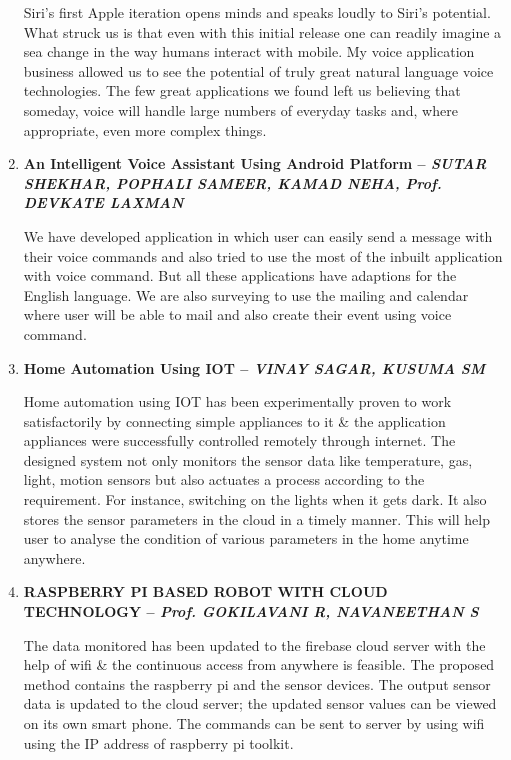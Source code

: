 \documentclass[16pt,oneside,a4paper]{article}
\begin{document}
\begin{enumerate}
Siri's first Apple iteration opens minds and speaks loudly to Siri's potential. What struck us is that even with this initial release one can readily imagine a sea change in the way humans interact with mobile. My voice application business allowed us to see the potential of truly great natural language voice technologies. The few great applications we found left us believing that someday, voice will handle large numbers of everyday tasks and, where appropriate, even more complex things.\\

\item \textbf{An Intelligent Voice Assistant Using Android Platform -- \textit{SUTAR SHEKHAR, POPHALI SAMEER, KAMAD NEHA, Prof. DEVKATE LAXMAN}}

We have developed application in which user can easily send a message with their voice commands and also tried to use the most of the inbuilt application with voice command. But all these applications have adaptions for the English language. We are also surveying to use the mailing and calendar where user will be able to mail and also create their event using voice command.\\

\item \textbf{Home Automation Using IOT  -- \textit{VINAY SAGAR, KUSUMA SM}}

Home automation using IOT has been experimentally proven to work satisfactorily by connecting simple appliances to it \& the application appliances were successfully controlled remotely through internet. The designed system not only monitors the sensor data like temperature, gas, light, motion sensors but also actuates a process according to the requirement. For instance, switching on the lights when it gets dark. It also stores the sensor parameters in the cloud in a timely manner. This will help user to analyse the condition of various parameters in the home anytime anywhere.\\

\item \textbf{RASPBERRY PI BASED ROBOT WITH CLOUD TECHNOLOGY -- \textit{ Prof. GOKILAVANI R, NAVANEETHAN S}}

The data monitored has been updated to the firebase cloud server with the help of wifi \& the continuous access from anywhere is feasible. The proposed method contains the raspberry pi and the sensor devices. The output sensor data is updated to the cloud server; the updated sensor values can be viewed on its own smart phone. The commands can be sent to server by using wifi using the IP address of raspberry pi toolkit. \\


\end{enumerate}
\end{document}
